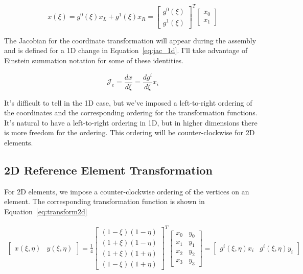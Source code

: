 \documentclass[11pt]{style/memo}
\begin{document}
\begin{equation}
    x(\xi) = g^0(\xi) x_L + g^1(\xi) x_R = \begin{bmatrix}
        g^0(\xi) \\ g^1(\xi)
    \end{bmatrix}^T
    \begin{bmatrix}
        x_0 \\ x_1
    \end{bmatrix}
\end{equation}

The Jacobian for the coordinate transformation will appear during the assembly and is
defined for a 1D change in Equation~\ref{eq:jac_1d}. I'll take advantage of Einstein
summation notation for some of these identities.

\begin{equation}
    \label{eq:jac_1d}
    \mathcal{J}_e = \frac{d x}{d\xi} = \frac{dg^i}{d\xi}x_i
\end{equation}

It's difficult to tell in the 1D case, but we've imposed a left-to-right ordering of
the coordinates and the corresponding ordering for the transformation functions.
It's natural to have a left-to-right ordering in 1D, but in higher dimensions there
is more freedom for the ordering. This ordering will be counter-clockwise
for 2D elements.

\subsection{2D Reference Element Transformation}
For 2D elements, we impose a counter-clockwise ordering of the vertices on an element.
The corresponding transformation function is shown in Equation~\ref{eq:transform2d}

\begin{eqnarray}
    \begin{bmatrix}
        x(\xi,\eta) & y(\xi,\eta)
    \end{bmatrix} = 
    \frac{1}{4}
    \begin{bmatrix}
        (1-\xi)(1-\eta) \\
        (1+\xi)(1-\eta) \\
        (1+\xi)(1+\eta) \\
        (1-\xi)(1+\eta)
    \end{bmatrix}^T
    \begin{bmatrix}
        x_0 & y_0 \\
        x_1 & y_1 \\
        x_2 & y_2 \\
        x_3 & y_3
    \end{bmatrix}
    = \begin{bmatrix}
        g^i(\xi,\eta)x_i &
        g^i(\xi,\eta)y_i
    \end{bmatrix}
    \label{eq:transform2d}
\end{eqnarray}
\end{document}
